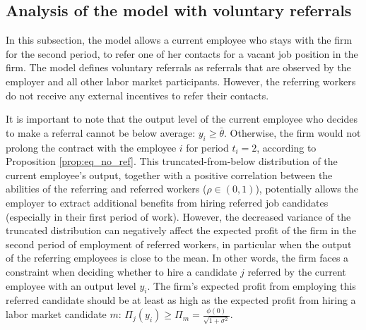 \documentclass[12pt]{article}
\begin{document}
\subsection{Analysis of the model with voluntary referrals}

In this subsection, the model allows a current employee who stays with the firm for the second period, to refer one of her contacts for a vacant job position in the firm. The model defines voluntary referrals as referrals that are observed by the employer and all other labor market participants. However, the referring workers do not receive any external incentives to refer their contacts.

It is important to note that the output level of the current employee who decides to make a referral cannot be below average: $y_i \geq \bar{\theta}$. Otherwise, the firm would not prolong the contract with the employee $i$ for period $t_i = 2$, according to Proposition \ref{prop:eq_no_ref}. This truncated-from-below distribution of the current employee's output, together with a positive correlation between the abilities of the referring and referred workers ($\rho \in (0,1)$), potentially allows the employer to extract additional benefits from hiring referred job candidates (especially in their first period of work). However, the decreased variance of the truncated distribution can negatively affect the expected profit of the firm in the second period of employment of referred workers, in particular when the output of the referring employees is close to the mean. In other words, the firm faces a constraint when deciding whether to hire a candidate $j$ referred by the current employee with an output level $y_i$. The firm's expected profit from employing this referred candidate should be at least as high as the expected profit from hiring a labor market candidate $m$: $\Pi_j (y_i) \geq \Pi_m = \frac{\phi(0)}{\sqrt{1+\sigma^2}}$.
\end{document}
